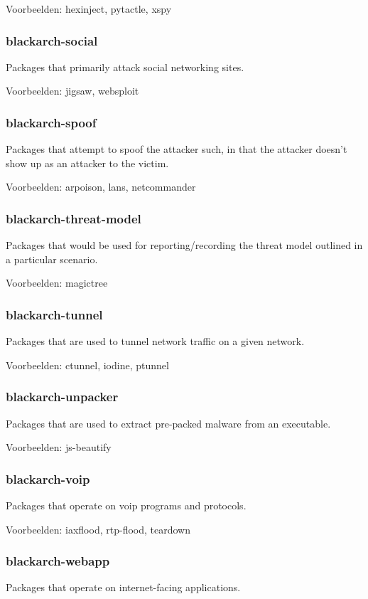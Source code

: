 \documentclass[a4paper, oneside, 11pt]{book}
\begin{document}
Voorbeelden: hexinject, pytactle, xspy

\subsubsection{blackarch-social}
Packages that primarily attack social networking sites.

Voorbeelden: jigsaw, websploit

\subsubsection{blackarch-spoof}
Packages that attempt to spoof the attacker such, in that
the attacker doesn't show up as an attacker to the victim.

Voorbeelden: arpoison, lans, netcommander

\subsubsection{blackarch-threat-model}
Packages that would be used for reporting/recording the
threat model outlined in a particular scenario.

Voorbeelden: magictree

\subsubsection{blackarch-tunnel}
Packages that are used to tunnel network traffic on a given
network.

Voorbeelden: ctunnel, iodine, ptunnel

\subsubsection{blackarch-unpacker}
Packages that are used to extract pre-packed malware from an
executable.

Voorbeelden: js-beautify

\subsubsection{blackarch-voip}
Packages that operate on voip programs and protocols.

Voorbeelden: iaxflood, rtp-flood, teardown

\subsubsection{blackarch-webapp}
Packages that operate on internet-facing applications.
\end{document}
